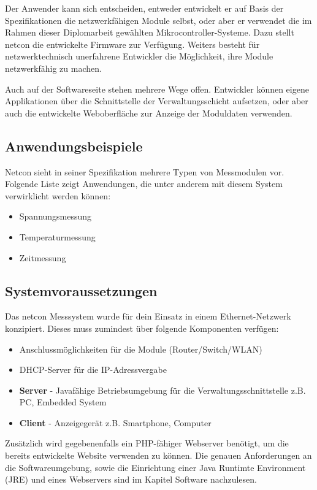 \documentclass[a4paper,14pt,headsepline]{scrartcl}
\begin{document}
Der Anwender kann sich entscheiden, entweder entwickelt er auf Basis der Spezifikationen die netzwerkfähigen Module selbst, oder aber er verwendet die im Rahmen dieser Diplomarbeit gewählten Mikrocontroller-Systeme. Dazu stellt netcon die entwickelte Firmware zur Verfügung. Weiters besteht für netzwerktechnisch unerfahrene Entwickler die Möglichkeit, ihre Module netzwerkfähig zu machen.
\newpage

Auch auf der Softwareseite stehen mehrere Wege offen. Entwickler können eigene Applikationen über die Schnittstelle der Verwaltungsschicht aufsetzen, oder aber auch die entwickelte Weboberfläche zur Anzeige der Moduldaten verwenden.

\subsection{Anwendungsbeispiele}
Netcon sieht in seiner Spezifikation mehrere Typen von Messmodulen vor. Folgende Liste zeigt Anwendungen, die unter anderem mit diesem System verwirklicht werden können:
\begin{itemize}
	\item Spannungsmessung
	\item Temperaturmessung
	\item Zeitmessung
\end{itemize}

\newpage

\subsection{Systemvoraussetzungen}

Das netcon Messsystem wurde für dein Einsatz in einem Ethernet-Netzwerk konzipiert. Dieses muss zumindest über folgende Komponenten verfügen:
\begin{itemize}
	\item Anschlussmöglichkeiten für die Module (Router/Switch/WLAN)
	\item DHCP-Server für die IP-Adressvergabe
	\item \textbf{Server} - Javafähige Betriebsumgebung für die Verwaltungsschnittstelle z.B. PC, Embedded System
	\item \textbf{Client} - Anzeigegerät z.B. Smartphone, Computer
\end{itemize}

Zusätzlich wird gegebenenfalls ein PHP-fähiger Webserver benötigt, um die bereits entwickelte Website verwenden zu können. Die genauen Anforderungen an die Softwareumgebung, sowie die Einrichtung einer Java Runtimte Environment (JRE) und eines Webservers sind im Kapitel Software nachzulesen.
\end{document}
